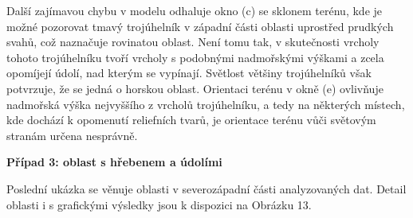 \par Další zajímavou chybu v modelu odhaluje okno (c) se sklonem terénu, kde je možné pozorovat tmavý trojúhelník v západní části oblasti uprostřed prudkých svahů, což naznačuje rovinatou oblast. Není tomu tak, v skutečnosti vrcholy tohoto trojúhelníku tvoří vrcholy s podobnými nadmořskými výškami a zcela opomíjejí údolí, nad kterým se vypínají. Světlost většiny trojúhelníků však potvrzuje, že se jedná o horskou oblast. Orientaci terénu v okně (e) ovlivňuje nadmořská výška nejvyššího z vrcholů trojúhelníku, a tedy na některých místech, kde dochází k opomenutí reliefních tvarů, je orientace terénu vůči světovým stranám určena nesprávně.
\bigbreak
\par {\large\textbf{Případ 3: oblast s hřebenem a údolími} }
\par Poslední ukázka se věnuje oblasti v severozápadní části analyzovaných dat. Detail oblasti i s grafickými výsledky jsou k dispozici na Obrázku 13. 

